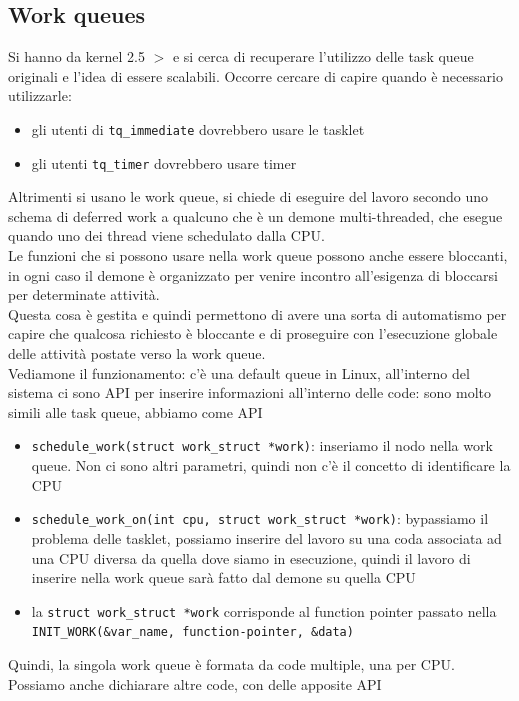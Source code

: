 \documentclass[12pt, oneside]{extbook}
\begin{document}
\subsection{Work queues}
Si hanno da kernel 2.5 $>$ e si cerca di recuperare l'utilizzo delle task queue originali e l'idea di essere scalabili. Occorre cercare di capire quando è necessario utilizzarle:
\begin{itemize}
\item gli utenti di \texttt{tq\_immediate} dovrebbero usare le tasklet
\item gli utenti \texttt{tq\_timer} dovrebbero usare timer 
\end{itemize}
Altrimenti si usano le work queue, si chiede di eseguire del lavoro secondo uno schema di deferred work a qualcuno che è un demone multi-threaded, che esegue quando uno dei thread viene schedulato dalla CPU.\\Le funzioni che si possono usare nella work queue possono anche essere bloccanti, in ogni caso il demone è organizzato per venire incontro all'esigenza di bloccarsi per determinate attività.\\Questa cosa è gestita e quindi permettono di avere una sorta di automatismo per capire che qualcosa richiesto è bloccante e di proseguire con l'esecuzione globale delle attività postate verso la work queue.\\Vediamone il funzionamento: c'è una default queue in Linux, all'interno del sistema ci sono API per inserire informazioni all'interno delle code: sono molto simili alle task queue, abbiamo come API
\begin{itemize}
\item \texttt{schedule\_work(struct work\_struct *work)}: inseriamo il nodo nella work queue. Non ci sono altri parametri, quindi non c'è il concetto di identificare la CPU
\item \texttt{schedule\_work\_on(int cpu, struct work\_struct *work)}: bypassiamo il problema delle tasklet, possiamo inserire del lavoro su una coda associata ad una CPU diversa da quella dove siamo in esecuzione, quindi il lavoro di inserire nella work queue sarà fatto dal demone su quella CPU
\item la \texttt{struct work\_struct *work} corrisponde al function pointer passato nella \texttt{INIT\_WORK(\&var\_name, function-pointer, \&data)}
\end{itemize}
Quindi, la singola work queue è formata da code multiple, una per CPU. Possiamo anche dichiarare altre code, con delle apposite API
\end{document}
